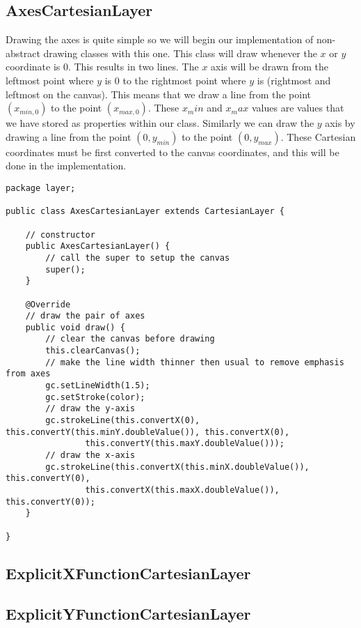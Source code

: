 \documentclass[../../../../main.tex]{subfiles}
\begin{document}
\subsection{AxesCartesianLayer}
Drawing the axes is quite simple so we will begin our implementation of non-abstract drawing classes with this one. This class will draw whenever the $x$ or $y$ coordinate is 0. This results in two lines. The $x$ axis will be drawn from the leftmost point where $y$ is 0 to the rightmost point where $y$ is (rightmost and leftmost on the canvas). This means that we draw a line from the point $(x_{min,0})$ to the point $(x_{max,0})$. These $x_min$ and $x_max$ values are values that we have stored as properties within our class. Similarly we can draw the $y$ axis by drawing a line from the point $(0,y_{min})$ to the point $(0,y_{max})$. These Cartesian coordinates must be first converted to the canvas coordinates, and this will be done in the implementation.
\begin{verbatim}
package layer;

public class AxesCartesianLayer extends CartesianLayer {

	// constructor
	public AxesCartesianLayer() {
		// call the super to setup the canvas
		super();
	}

	@Override
	// draw the pair of axes
	public void draw() {
		// clear the canvas before drawing
		this.clearCanvas();
		// make the line width thinner then usual to remove emphasis from axes
		gc.setLineWidth(1.5);
		gc.setStroke(color);
		// draw the y-axis
		gc.strokeLine(this.convertX(0), this.convertY(this.minY.doubleValue()), this.convertX(0),
				this.convertY(this.maxY.doubleValue()));
		// draw the x-axis
		gc.strokeLine(this.convertX(this.minX.doubleValue()), this.convertY(0),
				this.convertX(this.maxX.doubleValue()), this.convertY(0));
	}

}
\end{verbatim}
\newpage
\subsection{ExplicitXFunctionCartesianLayer}
\newpage
\subsection{ExplicitYFunctionCartesianLayer}
\newpage
\end{document}
